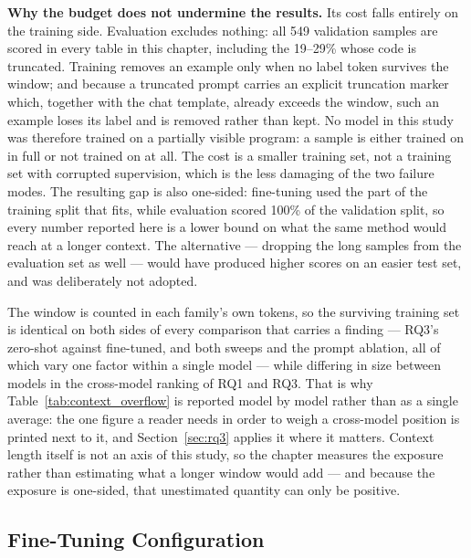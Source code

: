 \textbf{Why the budget does not undermine the results.} Its cost falls entirely on the training side. Evaluation excludes nothing: all 549 validation samples are scored in every table in this chapter, including the 19--29\% whose code is truncated. Training removes an example only when no label token survives the window; and because a truncated prompt carries an explicit truncation marker which, together with the chat template, already exceeds the window, such an example loses its label and is removed rather than kept. No model in this study was therefore trained on a partially visible program: a sample is either trained on in full or not trained on at all. The cost is a smaller training set, not a training set with corrupted supervision, which is the less damaging of the two failure modes. The resulting gap is also one-sided: fine-tuning used the part of the training split that fits, while evaluation scored 100\% of the validation split, so every number reported here is a lower bound on what the same method would reach at a longer context. The alternative --- dropping the long samples from the evaluation set as well --- would have produced higher scores on an easier test set, and was deliberately not adopted.

The window is counted in each family's own tokens, so the surviving training set is identical on both sides of every comparison that carries a finding --- RQ3's zero-shot against fine-tuned, and both sweeps and the prompt ablation, all of which vary one factor within a single model --- while differing in size between models in the cross-model ranking of RQ1 and RQ3. That is why Table~\ref{tab:context_overflow} is reported model by model rather than as a single average: the one figure a reader needs in order to weigh a cross-model position is printed next to it, and Section~\ref{sec:rq3} applies it where it matters. Context length itself is not an axis of this study, so the chapter measures the exposure rather than estimating what a longer window would add --- and because the exposure is one-sided, that unestimated quantity can only be positive.

\subsection{Fine-Tuning Configuration}
\label{sec:training_config}

